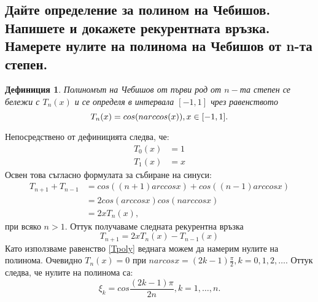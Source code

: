 \documentclass[12pt]{article}
\numberwithin{equation}{subsection}
\newtheorem{definition}{Дефиниция}
\numberwithin{theorem}{subsection}
\numberwithin{definition}{subsection}
\numberwithin{corollary}{subsection}
\begin{document}
\subsection{Дайте определение за полином на Чебишов. Напишете и докажете рекурентната връзка. Намерете нулите на полинома на Чебишов от n-та степен.}
  \begin{definition}Полиномът на Чебишов от първи род от $n-$та степен се бележи с $T_n(x)$ и се определя в интервала $[-1,1]$ чрез равенството 
  \begin{equation}\label{Tpoly}
    T_n(x)=cos(narccos(x)), \hfill x\in[-1,1].
  \end{equation}
  \end{definition}
  Непосредствено от дефиницията следва, че:
  \begin{align*}
    T_0(x) &=1\\
    T_1(x) &=x
  \end{align*}
  Освен това съгласно формулата за събиране на синуси:
  \begin{align*}
    T_{n+1}+T_{n-1}&=cos\left((n+1)arccosx\right)+cos\left((n-1)arccosx\right)\\             &=2cos(arccosx)cos(narccosx)\\
                   &=\boxed{2xT_n(x)},
  \end{align*}
  при всяко $n>1$. Оттук получаваме следната рекурентна връзка
  \begin{equation}\label{recTpoly}
    T_{n+1}=2xT_n(x)-T_{n-1}(x)
  \end{equation}
  Като използваме равенство \ref{Tpoly} веднага можем да намерим нулите на полинома. Очевидно $T_n(x)=0$ при $narcosx=(2k-1)\frac{\pi}{2}, k=0,1,2,\ldots$. Оттук следва, че нулите на полинома са:
  \begin{equation*}
    \xi_k=cos\frac{(2k-1)\pi}{2n}, k=1,\ldots,n.
  \end{equation*}
\end{document}
